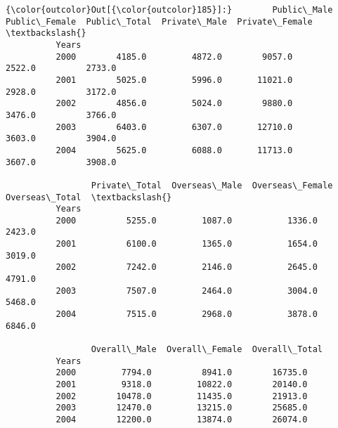 \documentclass[11pt]{article}
\begin{document}
\begin{Verbatim}[commandchars=\\\{\}]
{\color{outcolor}Out[{\color{outcolor}185}]:}        Public\_Male  Public\_Female  Public\_Total  Private\_Male  Private\_Female  \textbackslash{}
          Years                                                                           
          2000        4185.0         4872.0        9057.0        2522.0          2733.0   
          2001        5025.0         5996.0       11021.0        2928.0          3172.0   
          2002        4856.0         5024.0        9880.0        3476.0          3766.0   
          2003        6403.0         6307.0       12710.0        3603.0          3904.0   
          2004        5625.0         6088.0       11713.0        3607.0          3908.0   
          
                 Private\_Total  Overseas\_Male  Overseas\_Female  Overseas\_Total  \textbackslash{}
          Years                                                                  
          2000          5255.0         1087.0           1336.0          2423.0   
          2001          6100.0         1365.0           1654.0          3019.0   
          2002          7242.0         2146.0           2645.0          4791.0   
          2003          7507.0         2464.0           3004.0          5468.0   
          2004          7515.0         2968.0           3878.0          6846.0   
          
                 Overall\_Male  Overall\_Female  Overall\_Total  
          Years                                               
          2000         7794.0          8941.0        16735.0  
          2001         9318.0         10822.0        20140.0  
          2002        10478.0         11435.0        21913.0  
          2003        12470.0         13215.0        25685.0  
          2004        12200.0         13874.0        26074.0  
\end{Verbatim}
            
\end{document}
